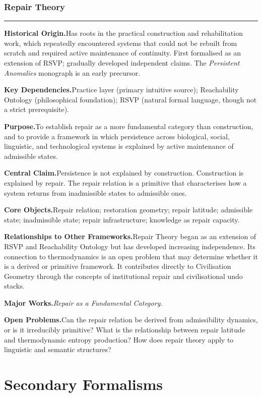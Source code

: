 \documentclass[12pt, twoside]{article}
\newcommand{\frameworkhead}[5]{  \subsubsection{#1}
  \noindent\textcolor{#2}{\rule{\linewidth}{0.8pt}}
  \smallskip

  \noindent\textbf{Historical Origin.}\quad #3

  \noindent\textbf{Key Dependencies.}\quad #4

  \noindent\textbf{Purpose.}\quad #5
}
\newcommand{\frameworkbody}[5]{  \noindent\textbf{Central Claim.}\quad #1

  \noindent\textbf{Core Objects.}\quad #2

  \noindent\textbf{Relationships to Other Frameworks.}\quad #3

  \noindent\textbf{Major Works.}\quad #4

  \noindent\textbf{Open Problems.}\quad #5
  \medskip
}
\begin{document}
\frameworkhead{Repair Theory}{repairteal}{Has roots in the practical construction and rehabilitation work, which
repeatedly encountered systems that could not be rebuilt from scratch and
required active maintenance of continuity. First formalised as an extension
of RSVP; gradually developed independent claims. The \emph{Persistent
Anomalies} monograph is an early precursor.}{Practice layer (primary intuitive source); Reachability Ontology
(philosophical foundation); RSVP (natural formal language, though not a
strict prerequisite).}{To establish repair as a more fundamental category than construction, and to
provide a framework in which persistence across biological, social,
linguistic, and technological systems is explained by active maintenance of
admissible states.}
\frameworkbody{Persistence is not explained by construction. Construction is explained by
repair. The repair relation is a primitive that characterises how a system
returns from inadmissible states to admissible ones.}{Repair relation; restoration geometry; repair latitude; admissible state;
inadmissible state; repair infrastructure; knowledge as repair capacity.}{Repair Theory began as an extension of RSVP and Reachability Ontology but
has developed increasing independence. Its connection to thermodynamics is an
open problem that may determine whether it is a derived or primitive
framework. It contributes directly to Civilisation Geometry through the
concepts of institutional repair and civilisational undo stacks.}{\emph{Repair as a Fundamental Category}.}{Can the repair relation be derived from admissibility dynamics, or is it
irreducibly primitive? What is the relationship between repair latitude and
thermodynamic entropy production? How does repair theory apply to linguistic
and semantic structures?}

\section{Secondary Formalisms}
\end{document}
